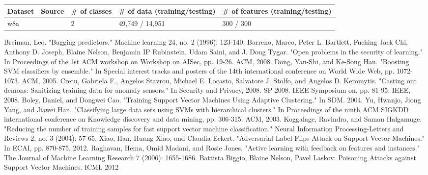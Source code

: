 \documentclass[10pt,conference,compsocconf,letterpaper]{IEEEtran}
\begin{document}
\begin{table*}[t]
\centering
\begin{tabular}{|l|l|l|l|l|}
\hline
Dataset&Source & \# of classes & \# of data (training/testing) & \# of features (training/testing) \\
\hline
w8a&\cite{jp98} & 2 & 49,749 / 14,951 & 300 / 300 \\
\hline
\end{tabular}
\end{table*}



\begin{thebibliography}{9}

Breiman, Leo. "Bagging predictors." Machine learning 24, no. 2 (1996): 123-140.
Barreno, Marco, Peter L. Bartlett, Fuching Jack Chi, Anthony D. Joseph, Blaine Nelson, Benjamin IP Rubinstein, Udam Saini, and J. Doug Tygar. "Open problems in the security of learning." In Proceedings of the 1st ACM workshop on Workshop on AISec, pp. 19-26. ACM, 2008.
Dong, Yan-Shi, and Ke-Song Han. "Boosting SVM classifiers by ensemble." In Special interest tracks and posters of the 14th international conference on World Wide Web, pp. 1072-1073. ACM, 2005.
Cretu, Gabriela F., Angelos Stavrou, Michael E. Locasto, Salvatore J. Stolfo, and Angelos D. Keromytis. "Casting out demons: Sanitizing training data for anomaly sensors." In Security and Privacy, 2008. SP 2008. IEEE Symposium on, pp. 81-95. IEEE, 2008.
Boley, Daniel, and Dongwei Cao. "Training Support Vector Machines Using Adaptive Clustering." In SDM. 2004.
Yu, Hwanjo, Jiong Yang, and Jiawei Han. "Classifying large data sets using SVMs with hierarchical clusters." In Proceedings of the ninth ACM SIGKDD international conference on Knowledge discovery and data mining, pp. 306-315. ACM, 2003.
Koggalage, Ravindra, and Saman Halgamuge. "Reducing the number of training samples for fast support vector machine classification." Neural Information Processing-Letters and Reviews 2, no. 3 (2004): 57-65.
Xiao, Han, Huang Xiao, and Claudia Eckert. "Adversarial Label Flips Attack on Support Vector Machines." In ECAI, pp. 870-875. 2012.
Raghavan, Hema, Omid Madani, and Rosie Jones. "Active learning with feedback on features and instances." The Journal of Machine Learning Research 7 (2006): 1655-1686.
Battista Biggio, Blaine Nelson, Pavel Laskov: Poisoning Attacks against Support Vector Machines. ICML 2012

\end{thebibliography}
\end{document}
